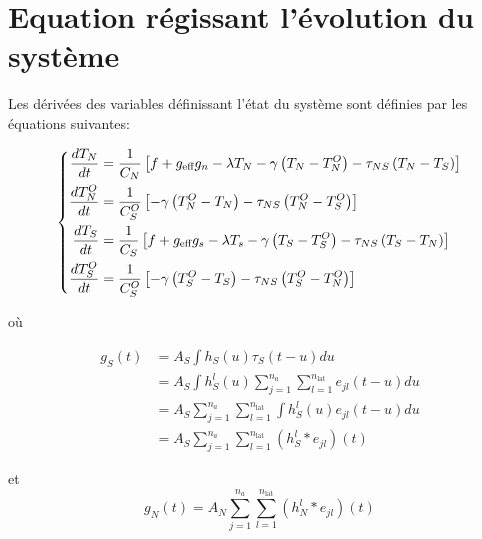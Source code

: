 \documentclass[a4paper,12pt]{article}
\begin{document}
\section{Equation régissant l'évolution du système}

Les dérivées des variables définissant l'état du système sont définies par les équations suivantes:

\begin{equation}
  \left\{
\begin{aligned}
  \frac{dT_N}{dt}&=\frac{1}{C_N}\left[f+g_{\text{eff}}g_n - \lambda T_N - \gamma\left(T_N-T_N^O\right) - \tau_{NS}\left(T_N-T_S\right)\right] \\
  \frac{dT_N^O}{dt}&=\frac{1}{C_S^O}\left[-\gamma\left(T_N^O-T_N\right)-\tau_{NS}\left(T_N^O-T_S^O\right)\right] \\
  \frac{dT_S}{dt}&=\frac{1}{C_S}\left[f+g_{\text{eff}}g_s - \lambda T_s - \gamma\left(T_S-T_S^O\right) - \tau_{NS}\left(T_S-T_N\right)\right] \\
  \frac{dT_S^O}{dt}&=\frac{1}{C_S^O}\left[-\gamma\left(T_S^O - T_S\right) - \tau_{NS}\left(T_S^O-T_N^O\right)\right] \\
\end{aligned}
\right.
\end{equation}

où

\begin{align*}
  g_S(t)&=A_S\int h_S(u)\tau_S(t-u) du\\
     &=A_S\int h_S^l(u)\sum_{j=1}^{n_a}\sum_{l=1}^{n_{\text{lat}}}  e_{jl}(t-u) du \\
     &=A_S\sum_{j=1}^{n_a}\sum_{l=1}^{n_{\text{lat}}} \int h_S^l(u) e_{jl}(t-u) du \\
     &=A_S\sum_{j=1}^{n_a}\sum_{l=1}^{n_{\text{lat}}}  \left(h_S^l \ast  e_{jl}\right)(t)
\end{align*}

 et 
\begin{equation}
  g_N(t) =A_N\sum_{j=1}^{n_a}\sum_{l=1}^{n_{\text{lat}}}  \left(h_N^l \ast  e_{jl}\right)(t)
\end{equation}
\end{document}
